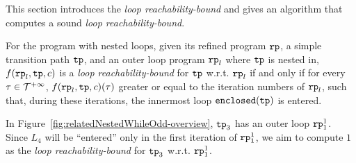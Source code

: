 This section introduces the \emph{loop reachability-bound} and gives an algorithm
that computes a sound \emph{loop reachability-bound}.


\begin{defn}
For the program with nested loops, given its refined program $\mathtt{rp}$, a simple transition path $\mathtt{tp}$, and an outer loop
program $\mathtt{rp}_l$ where $\mathtt{tp}$ is nested in,
$f(\mathtt{rp}_l, \mathtt{tp}, c)$ is a \emph{loop reachability-bound} for $\mathtt{tp}$ w.r.t. $\mathtt{rp}_l$ if and only if
for every $\mathtt{\tau} \in \mathcal{T}^{+\infty}$, $f(\mathtt{rp}_l, \mathtt{tp}, c)(\mathtt{\tau})$ greater or equal to the
iteration numbers of $\mathtt{rp}_l$,
such that,
during these iterations, the innermost loop $\mathtt{enclosed(\mathtt{tp})}$ is entered.
\end{defn}
In Figure~\ref{fig:relatedNestedWhileOdd-overview}, $\mathtt{tp}_3$ has an outer loop $\mathtt{rp}_1^1$. Since $L_4$ will be ``entered'' only in the first iteration of $\mathtt{rp}_1^1$,
we aim to compute $1$ as the \emph{loop reachability-bound} for $\mathtt{tp}_3$ w.r.t. $\mathtt{rp}_1^1$.


